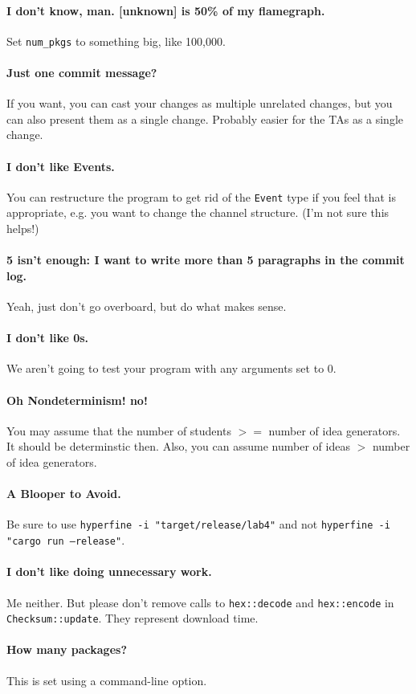 \paragraph{I don't know, man. [unknown] is 50\% of my flamegraph.} Set \texttt{num\_pkgs} to something big, like 100,000.

\paragraph{Just one commit message?} If you want, you can cast your changes as multiple unrelated changes, but you can also 
present them as a single change. Probably easier for the TAs as a single change.

\paragraph{I don't like Events.} You can restructure the program to get rid of the \texttt{Event} type if you feel that is
appropriate, e.g. you want to change the channel structure. (I'm not sure this helps!)

\paragraph{5 isn't enough: I want to write more than 5 paragraphs in the commit log.} Yeah, just don't go overboard, but do
what makes sense.

\paragraph{I don't like 0s.} We aren't going to test your program with any arguments set to 0.

\paragraph{Oh Nondeterminism! no!} You may assume that the number of students $>=$ number of idea generators.
It should be determinstic then. Also, you can assume number of ideas $>$ number of idea generators.

\paragraph{A Blooper to Avoid.} Be sure to use \texttt{hyperfine -i "target/release/lab4"} and not 
\texttt{hyperfine -i "cargo run --release"}.

\paragraph{I don't like doing unnecessary work.} Me neither. But please don't remove calls to \texttt{hex::decode} and \texttt{hex::encode} in \texttt{Checksum::update}. They represent download time.

\paragraph{How many packages?} This is set using a command-line option.


